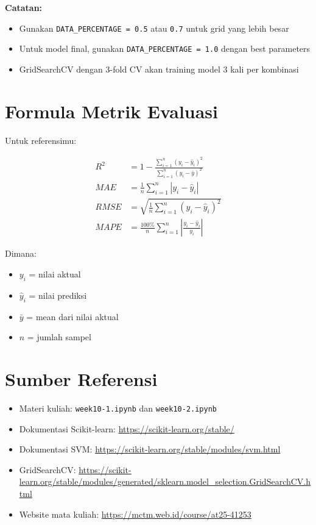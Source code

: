 \documentclass[12pt,a4paper]{article}
\begin{document}
\textbf{Catatan:}
\begin{itemize}
    \item Gunakan \texttt{DATA\_PERCENTAGE = 0.5} atau \texttt{0.7} untuk grid yang lebih besar
    \item Untuk model final, gunakan \texttt{DATA\_PERCENTAGE = 1.0} dengan best parameters
    \item GridSearchCV dengan 3-fold CV akan training model 3 kali per kombinasi
\end{itemize}

\section{Formula Metrik Evaluasi}

Untuk referensimu:

\begin{align}
R^2 &= 1 - \frac{\sum_{i=1}^{n}(y_i - \hat{y}_i)^2}{\sum_{i=1}^{n}(y_i - \bar{y})^2} \\
MAE &= \frac{1}{n}\sum_{i=1}^{n}|y_i - \hat{y}_i| \\
RMSE &= \sqrt{\frac{1}{n}\sum_{i=1}^{n}(y_i - \hat{y}_i)^2} \\
MAPE &= \frac{100\%}{n}\sum_{i=1}^{n}\left|\frac{y_i - \hat{y}_i}{y_i}\right|
\end{align}

Dimana:
\begin{itemize}
    \item $y_i$ = nilai aktual
    \item $\hat{y}_i$ = nilai prediksi
    \item $\bar{y}$ = mean dari nilai aktual
    \item $n$ = jumlah sampel
\end{itemize}

\section{Sumber Referensi}

\begin{itemize}
    \item Materi kuliah: \texttt{week10-1.ipynb} dan \texttt{week10-2.ipynb}
    \item Dokumentasi Scikit-learn: \url{https://scikit-learn.org/stable/}
    \item Dokumentasi SVM: \url{https://scikit-learn.org/stable/modules/svm.html}
    \item GridSearchCV: \url{https://scikit-learn.org/stable/modules/generated/sklearn.model_selection.GridSearchCV.html}
    \item Website mata kuliah: \url{https://mctm.web.id/course/at25-41253}
\end{itemize}
\end{document}
